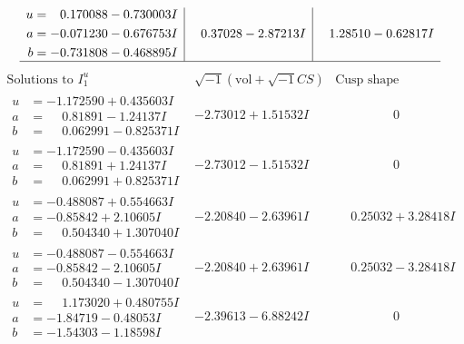 \documentclass[1p]{elsarticle_modified}
\theoremstyle{definition}
\newcommand{\I}{\sqrt{-1}}
\begin{document}
$$\begin{array}{c|c|c}
\begin{aligned}
u &= \phantom{-}0.170088 - 0.730003 I \\
a &= -0.071230 - 0.676753 I \\
b &= -0.731808 - 0.468895 I\end{aligned}
 & \phantom{-}0.37028 - 2.87213 I & \phantom{-}1.28510 - 0.62817 I\\
 \hline 
 \end{array}$$\newpage$$\begin{array}{c|c|c}  
\text{Solutions to }I^u_{1}& \I (\text{vol} + \sqrt{-1}CS) & \text{Cusp shape}\\
 \hline 
\begin{aligned}
u &= -1.172590 + 0.435603 I \\
a &= \phantom{-}0.81891 - 1.24137 I \\
b &= \phantom{-}0.062991 - 0.825371 I\end{aligned}
 & -2.73012 + 1.51532 I & \phantom{-0.000000 } 0 \\ \hline\begin{aligned}
u &= -1.172590 - 0.435603 I \\
a &= \phantom{-}0.81891 + 1.24137 I \\
b &= \phantom{-}0.062991 + 0.825371 I\end{aligned}
 & -2.73012 - 1.51532 I & \phantom{-0.000000 } 0 \\ \hline\begin{aligned}
u &= -0.488087 + 0.554663 I \\
a &= -0.85842 + 2.10605 I \\
b &= \phantom{-}0.504340 + 1.307040 I\end{aligned}
 & -2.20840 - 2.63961 I & \phantom{-}0.25032 + 3.28418 I \\ \hline\begin{aligned}
u &= -0.488087 - 0.554663 I \\
a &= -0.85842 - 2.10605 I \\
b &= \phantom{-}0.504340 - 1.307040 I\end{aligned}
 & -2.20840 + 2.63961 I & \phantom{-}0.25032 - 3.28418 I \\ \hline\begin{aligned}
u &= \phantom{-}1.173020 + 0.480755 I \\
a &= -1.84719 - 0.48053 I \\
b &= -1.54303 - 1.18598 I\end{aligned}
 & -2.39613 - 6.88242 I & \phantom{-0.000000 } 0 \\ \hline\begin{aligned}

\end{aligned}
\end{array}$$
\end{document}
